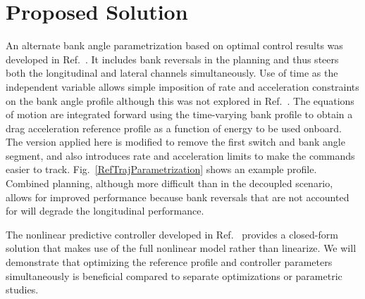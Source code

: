 \documentclass[10pt,a4paper]{article}
\begin{document}
		
	\section{Proposed Solution}
	An alternate bank angle parametrization based on optimal control results was developed in Ref.~\cite{High Elevation Landing}. It includes bank reversals in the planning and thus steers both the longitudinal and lateral channels simultaneously. Use of time as the independent variable allows simple imposition of rate and acceleration constraints on the bank angle profile although this was not explored in Ref.~\cite{High Elevation Landing}. The equations of motion are integrated forward using the time-varying bank profile to obtain a drag acceleration reference profile as a function of energy to be used onboard. The version applied here is modified to remove the first switch and bank angle segment, and also introduces rate and acceleration limits to make the commands easier to track. Fig.~\ref{RefTrajParametrization} shows an example profile. Combined planning, although more difficult than in the decoupled scenario, allows for improved performance because bank reversals that are not accounted for will degrade the longitudinal performance. 
	
	The nonlinear predictive controller developed in Ref.~\cite{JoelController} provides a closed-form solution that makes use of the full nonlinear model rather than linearize. We will demonstrate that optimizing the reference profile and controller parameters simultaneously is beneficial compared to separate optimizations or parametric studies.
	
	
\end{document}

